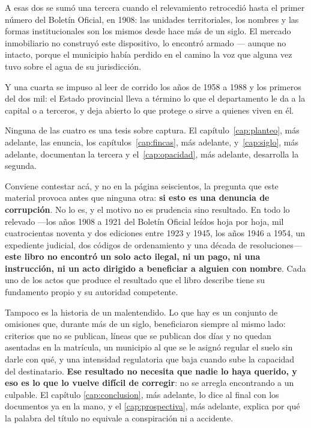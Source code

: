 A esas dos se sumó una tercera cuando el relevamiento retrocedió hasta el primer número del Boletín Oficial, en 1908: las unidades territoriales, los nombres y las formas institucionales son los mismos desde hace más de un siglo. El mercado inmobiliario no construyó este dispositivo, lo encontró armado --- aunque no intacto, porque el municipio había perdido en el camino la voz que alguna vez tuvo sobre el agua de su jurisdicción.

Y una cuarta se impuso al leer de corrido los años de 1958 a 1988 y los primeros del dos mil: el Estado provincial lleva a término lo que el departamento le da a la capital o a terceros, y deja abierto lo que protege o sirve a quienes viven en él.

Ninguna de las cuatro es una tesis sobre captura. El capítulo~\ref{cap:planteo}, más adelante, las enuncia, los capítulos~\ref{cap:fincas}, más adelante, y~\ref{cap:siglo}, más adelante, documentan la tercera y el~\ref{cap:opacidad}, más adelante, desarrolla la segunda.

Conviene contestar acá, y no en la página seiscientos, la pregunta que este material provoca
antes que ninguna otra: \textbf{si esto es una denuncia de corrupción}. No lo es, y el motivo no
es prudencia sino resultado. En todo lo relevado ---los años 1908 a 1921 del Boletín Oficial leídos hoja
por hoja, mil cuatrocientas noventa y dos ediciones entre 1923 y 1945, los años
1946 a 1954, un expediente judicial, dos códigos de ordenamiento y una década de
resoluciones--- \textbf{este libro no encontró un solo acto ilegal, ni un pago, ni una
instrucción, ni un acto dirigido a beneficiar a alguien con nombre}. Cada uno de los actos que
produce el resultado que el libro describe tiene su fundamento propio y su autoridad
competente.

Tampoco es la historia de un malentendido. Lo que hay es un conjunto de omisiones que, durante
más de un siglo, beneficiaron siempre al mismo lado: criterios que no se publican, líneas que se
publican dos días y no quedan asentadas en la matrícula, un municipio al que se le asignó
regular el suelo sin darle con qué, y una intensidad regulatoria que baja cuando sube la
capacidad del destinatario. \textbf{Ese resultado no necesita que nadie lo haya querido, y eso
es lo que lo vuelve difícil de corregir}: no se arregla encontrando a un culpable. El capítulo
\ref{cap:conclusion}, más adelante, lo dice al final con los documentos ya en la mano, y el
\ref{cap:prospectiva}, más adelante, explica por qué la palabra del título no equivale a conspiración ni a
accidente.

